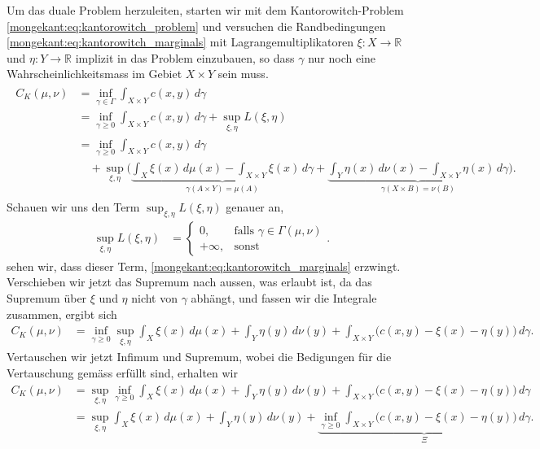 Um das duale Problem herzuleiten,
starten wir mit dem Kantorowitch-Problem \eqref{mongekant:eq:kantorowitch_problem}
und versuchen die Randbedingungen \eqref{mongekant:eq:kantorowitch_marginals}
mit Lagrangemultiplikatoren $\xi \colon X \to \mathbb{R}$ und
$\eta \colon Y \to \mathbb{R}$ implizit in das Problem einzubauen,
so dass $\gamma$ nur noch eine Wahrscheinlichkeitsmass im Gebiet $X\times Y$ sein muss.
\begin{align*}
\begin{aligned}
C_K(\mu, \nu)
&=
\inf_{\gamma \in \Gamma} \int_{X \times Y} c(x,y)\, d\gamma
\\
&=
\inf_{\gamma \geq 0} \int_{X \times Y} c(x,y)\, d\gamma
+ \sup_{\xi, \eta} L(\xi, \eta)
\\
&=
\inf_{\gamma \geq 0} \int_{X \times Y} c(x,y)\, d\gamma
\\
&\quad
+ \sup_{\xi, \eta} \Biggl(
\underbrace{
\int_X \xi(x)\, d\mu(x) - \int_{X \times Y} \xi(x)\, d\gamma
}_{\gamma(A \times Y) = \mu(A)}
+ \underbrace{
\int_Y \eta(x)\, d\nu(x) - \int_{X \times Y} \eta(x)\, d\gamma
}_{\gamma(X \times B) = \nu(B)}
\Biggr)
.
\end{aligned}
\end{align*}
Schauen wir uns den Term $\sup_{\xi, \eta} L(\xi, \eta)$ genauer an,
\begin{align*}
\sup_{\xi, \eta} L(\xi, \eta)
&=
\begin{cases}
0,
& \text{falls } \gamma \in \Gamma(\mu, \nu) \\
+\infty,
& \text{sonst}
\end{cases}
.
\end{align*}
sehen wir,
dass dieser Term,
\eqref{mongekant:eq:kantorowitch_marginals} erzwingt.
Verschieben wir jetzt das Supremum nach aussen,
was erlaubt ist,
da das Supremum über $\xi$ und $\eta$ nicht von $\gamma$ abhängt,
und fassen wir die Integrale zusammen,
ergibt sich
\begin{align*}
C_K(\mu, \nu)
&=
\inf_{\gamma \geq 0}
\sup_{\xi, \eta}
\int_X \xi(x)\, d\mu(x)
+ \int_Y \eta(y)\, d\nu(y)
+ \int_{X \times Y} \bigl(c(x,y) - \xi(x) - \eta(y)\bigr)\, d\gamma
.
\end{align*}
Vertauschen wir jetzt Infimum und Supremum,
wobei die Bedigungen für die Vertauschung gemäss \cite{mongekant:villani} erfüllt sind,
erhalten wir
\begin{align*}
C_K(\mu, \nu)
&=
\sup_{\xi, \eta}
\inf_{\gamma \geq 0} \int_X \xi(x)\, d\mu(x)
+ \int_Y \eta(y)\, d\nu(y)
+ \int_{X \times Y} \bigl(c(x,y) - \xi(x) - \eta(y)\bigr)\, d\gamma
\\
&=
\sup_{\xi, \eta} \int_X \xi(x)\, d\mu(x)
+ \int_Y \eta(y)\, d\nu(y)
+ \underbrace{
\inf_{\gamma \geq 0} \int_{X \times Y} \bigl(c(x,y) - \xi(x) - \eta(y)\bigr)\, d\gamma
}_{\Xi}
.
\end{align*}
